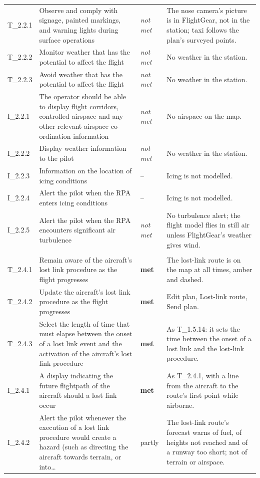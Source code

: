 \begin{longtable}{@{}>{\raggedright\arraybackslash}p{12mm}>{\raggedright\arraybackslash}p{57mm}>{\raggedright\arraybackslash}p{13mm}>{\raggedright\arraybackslash}p{70mm}@{}}
T\_2.2.1 & Observe and comply with signage, painted markings, and warning lights during surface operations & \emph{not met} & The nose camera's picture is in FlightGear, not in the station; taxi follows the plan's surveyed points. \\
T\_2.2.2 & Monitor weather that has the potential to affect the flight & \emph{not met} & No weather in the station. \\
T\_2.2.3 & Avoid weather that has the potential to affect the flight & \emph{not met} & No weather in the station. \\
I\_2.2.1 & The operator should be able to display flight corridors, controlled airspace and any other relevant airspace co-ordination information & \emph{not met} & No airspace on the map. \\
I\_2.2.2 & Display weather information to the pilot & \emph{not met} & No weather in the station. \\
I\_2.2.3 & Information on the location of icing conditions & -- & Icing is not modelled. \\
I\_2.2.4 & Alert the pilot when the RPA enters icing conditions & -- & Icing is not modelled. \\
I\_2.2.5 & Alert the pilot when the RPA encounters significant air turbulence & \emph{not met} & No turbulence alert; the flight model flies in still air unless FlightGear's weather gives wind. \\
\addlinespace\multicolumn{4}{@{}l}{\textbf{The lost-link route}} \\
T\_2.4.1 & Remain aware of the aircraft’s lost link procedure as the flight progresses & \textbf{met} & The lost-link route is on the map at all times, amber and dashed. \\
T\_2.4.2 & Update the aircraft’s lost link procedure as the flight progresses & \textbf{met} & Edit plan, Lost-link route, Send plan. \\
T\_2.4.3 & Select the length of time that must elapse between the onset of a lost link event and the activation of the aircraft’s lost link procedure & \textbf{met} & As T\_1.5.14: it sets the time between the onset of a lost link and the lost-link procedure. \\
I\_2.4.1 & A display indicating the future flightpath of the aircraft should a lost link occur & \textbf{met} & As T\_2.4.1, with a line from the aircraft to the route's first point while airborne. \\
I\_2.4.2 & Alert the pilot whenever the execution of a lost link procedure would create a hazard (such as directing the aircraft towards terrain, or into\ldots{} & partly & The lost-link route's forecast warns of fuel, of heights not reached and of a runway too short; not of terrain or airspace. \\

\end{longtable}
